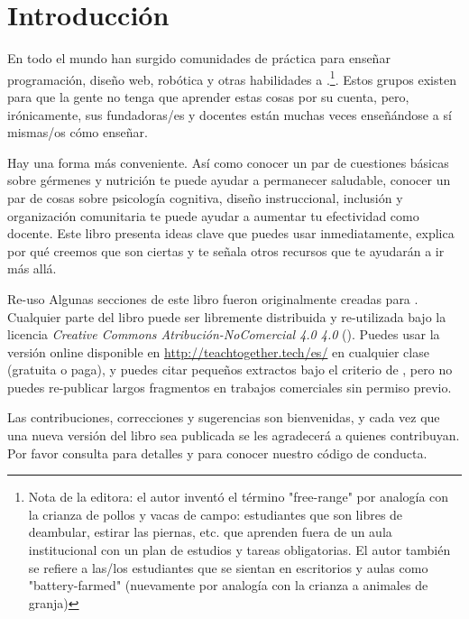 \chapter{Introducción}\label{s:intro}

En todo el mundo han surgido comunidades de práctica
para enseñar programación, diseño web, robótica y otras habilidades 
a .\footnote{Nota de la editora: el autor inventó el término "free-range" 
por analogía con la crianza de pollos y vacas de campo: estudiantes que son libres de deambular, estirar las piernas, etc.
que aprenden fuera de un aula institucional con un plan de estudios y tareas obligatorias. 
El autor también se refiere a las/los estudiantes 
que se sientan en escritorios y aulas como "battery-farmed" 
(nuevamente por analogía con la crianza a animales de granja)}.
Estos grupos existen para que la gente no tenga que aprender estas cosas por su cuenta,
pero, irónicamente,
sus fundadoras/es y docentes están muchas veces enseñándose a sí mismas/os cómo enseñar.

Hay una forma más conveniente.
Así como conocer un par de cuestiones básicas sobre gérmenes y nutrición te puede ayudar a permanecer saludable,
conocer un par de cosas sobre psicología cognitiva,
diseño instruccional,
inclusión
y organización comunitaria
te puede ayudar a aumentar tu efectividad como docente.
Este libro presenta ideas clave que puedes usar inmediatamente,
explica por qué creemos que son ciertas
y te señala otros recursos que te ayudarán a ir más allá.

\begin{aside}{Re-uso}
Algunas secciones de este libro fueron originalmente creadas para
 .
 Cualquier parte del libro puede ser libremente distribuida y re-utilizada
bajo la licencia \emph{Creative Commons Atribución-NoComercial 4.0 4.0}
 ().
Puedes usar la versión online disponible en \url{http://teachtogether.tech/es/} 
en cualquier clase
(gratuita o paga),
y puedes citar pequeños extractos bajo el criterio de ,
pero no puedes re-publicar largos fragmentos en trabajos comerciales sin permiso previo.

Las contribuciones, correcciones y sugerencias son bienvenidas,
y cada vez que una nueva versión del libro sea publicada se les agradecerá a quienes contribuyan.
Por favor consulta  para detalles
y  para conocer nuestro código de conducta. 
\end{aside}

